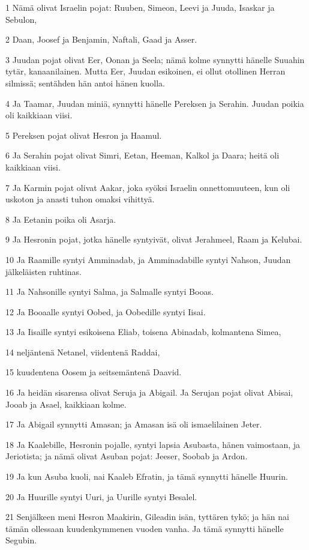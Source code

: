 \par 1 Nämä olivat Israelin pojat: Ruuben, Simeon, Leevi ja Juuda, Isaskar ja Sebulon,
\par 2 Daan, Joosef ja Benjamin, Naftali, Gaad ja Asser.
\par 3 Juudan pojat olivat Eer, Oonan ja Seela; nämä kolme synnytti hänelle Suuahin tytär, kanaanilainen. Mutta Eer, Juudan esikoinen, ei ollut otollinen Herran silmissä; sentähden hän antoi hänen kuolla.
\par 4 Ja Taamar, Juudan miniä, synnytti hänelle Pereksen ja Serahin. Juudan poikia oli kaikkiaan viisi.
\par 5 Pereksen pojat olivat Hesron ja Haamul.
\par 6 Ja Serahin pojat olivat Simri, Eetan, Heeman, Kalkol ja Daara; heitä oli kaikkiaan viisi.
\par 7 Ja Karmin pojat olivat Aakar, joka syöksi Israelin onnettomuuteen, kun oli uskoton ja anasti tuhon omaksi vihittyä.
\par 8 Ja Eetanin poika oli Asarja.
\par 9 Ja Hesronin pojat, jotka hänelle syntyivät, olivat Jerahmeel, Raam ja Kelubai.
\par 10 Ja Raamille syntyi Amminadab, ja Amminadabille syntyi Nahson, Juudan jälkeläisten ruhtinas.
\par 11 Ja Nahsonille syntyi Salma, ja Salmalle syntyi Booas.
\par 12 Ja Booaalle syntyi Oobed, ja Oobedille syntyi Iisai.
\par 13 Ja Iisaille syntyi esikoisena Eliab, toisena Abinadab, kolmantena Simea,
\par 14 neljäntenä Netanel, viidentenä Raddai,
\par 15 kuudentena Oosem ja seitsemäntenä Daavid.
\par 16 Ja heidän sisarensa olivat Seruja ja Abigail. Ja Serujan pojat olivat Abisai, Jooab ja Asael, kaikkiaan kolme.
\par 17 Ja Abigail synnytti Amasan; ja Amasan isä oli ismaelilainen Jeter.
\par 18 Ja Kaalebille, Hesronin pojalle, syntyi lapsia Asubasta, hänen vaimostaan, ja Jeriotista; ja nämä olivat Asuban pojat: Jeeser, Soobab ja Ardon.
\par 19 Ja kun Asuba kuoli, nai Kaaleb Efratin, ja tämä synnytti hänelle Huurin.
\par 20 Ja Huurille syntyi Uuri, ja Uurille syntyi Besalel.
\par 21 Senjälkeen meni Hesron Maakirin, Gileadin isän, tyttären tykö; ja hän nai tämän ollessaan kuudenkymmenen vuoden vanha. Ja tämä synnytti hänelle Segubin.

